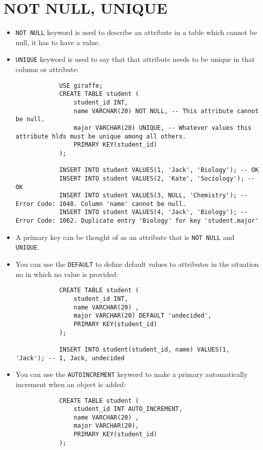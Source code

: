 \section{NOT NULL, UNIQUE}
\begin{itemize}
    \item \texttt{NOT NULL} keyword is used to describe an attribute in a table which cannot be null, it has to have a value.
    \item \texttt{UNIQUE} keyword is used to say that that attribute needs to be unique in that column or attribute:
        \begin{verbatim}
            USE giraffe;
            CREATE TABLE student (
                student_id INT,
                name VARCHAR(20) NOT NULL, -- This attribute cannot be null.
                major VARCHAR(20) UNIQUE, -- Whatever values this attribute hlds must be unique among all others.
                PRIMARY KEY(student_id)
            );

            INSERT INTO student VALUES(1, 'Jack', 'Biology'); -- OK
            INSERT INTO student VALUES(2, 'Kate', 'Sociology'); -- OK
            INSERT INTO student VALUES(3, NULL, 'Chemistry'); -- Error Code: 1048. Column 'name' cannot be null.
            INSERT INTO student VALUES(4, 'Jack', 'Biology'); -- Error Code: 1062. Duplicate entry 'Biology' for key 'student.major'
        \end{verbatim}
    
    \item A primary key can be thought of as an attribute that is \texttt{NOT NULL} and \texttt{UNIQUE}. 
    \item You can use the \texttt{DEFAULT} to define default values to attributes in the situation no in which no value is provided:
        \begin{verbatim}
            CREATE TABLE student (
                student_id INT,
                name VARCHAR(20) ,
                major VARCHAR(20) DEFAULT 'undecided',
                PRIMARY KEY(student_id)
            );

            INSERT INTO student(student_id, name) VALUES(1, 'Jack'); -- 1, Jack, undecided
        \end{verbatim}
    \item You can use the \texttt{AUTOINCREMENT} keyword to make a primary automatically increment when an object is added:
        \begin{verbatim}
            CREATE TABLE student (
                student_id INT AUTO_INCREMENT,
                name VARCHAR(20) ,
                major VARCHAR(20),
                PRIMARY KEY(student_id)
            );


\end{verbatim}
\end{itemize}

